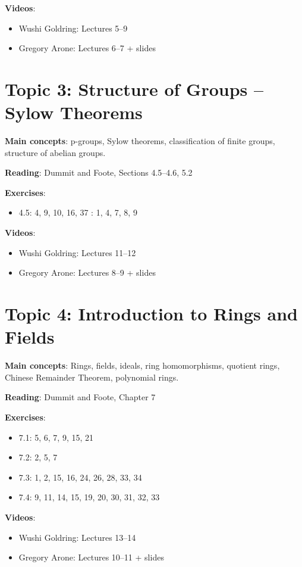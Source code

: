\documentclass[12pt]{article}
\begin{document}
\textbf{Videos}:
\begin{itemize}
    \item Wushi Goldring: Lectures 5–9
    \item Gregory Arone: Lectures 6–7 + slides
\end{itemize}

\section{Topic 3: Structure of Groups – Sylow Theorems}
\textbf{Main concepts}: p-groups, Sylow theorems, classification of finite groups, structure of abelian groups.

\textbf{Reading}: Dummit and Foote, Sections 4.5–4.6, 5.2

\textbf{Exercises}:
\begin{itemize}
    \item 4.5: 4, 9, 10, 16, 37 : 1, 4, 7, 8, 9
\end{itemize}

\textbf{Videos}:
\begin{itemize}
    \item Wushi Goldring: Lectures 11–12
    \item Gregory Arone: Lectures 8–9 + slides
\end{itemize}

\section{Topic 4: Introduction to Rings and Fields}
\textbf{Main concepts}: Rings, fields, ideals, ring homomorphisms, quotient rings, Chinese Remainder Theorem, polynomial rings.

\textbf{Reading}: Dummit and Foote, Chapter 7

\textbf{Exercises}:
\begin{itemize}
    \item 7.1: 5, 6, 7, 9, 15, 21
    \item 7.2: 2, 5, 7
    \item 7.3: 1, 2, 15, 16, 24, 26, 28, 33, 34
    \item 7.4: 9, 11, 14, 15, 19, 20, 30, 31, 32, 33
\end{itemize}

\textbf{Videos}:
\begin{itemize}
    \item Wushi Goldring: Lectures 13–14
    \item Gregory Arone: Lectures 10–11 + slides
\end{itemize}
\end{document}
